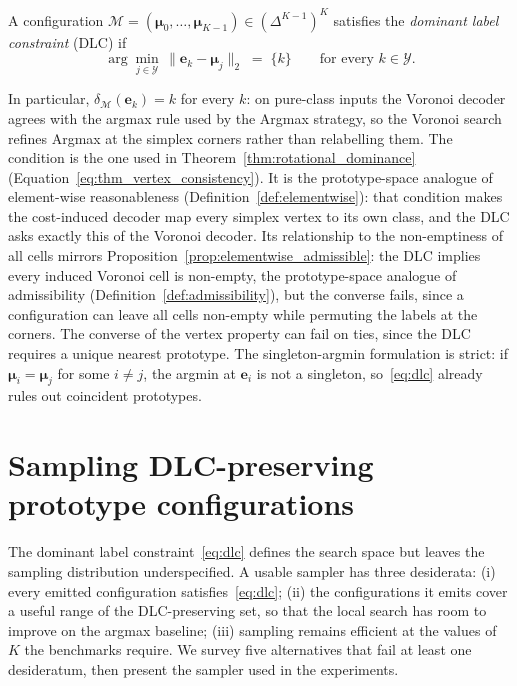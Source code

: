 \begin{definition}\label{def:dlc}
A configuration $\mathcal{M} = (\boldsymbol{\mu}_0, \ldots, \boldsymbol{\mu}_{K-1}) \in (\Delta^{K-1})^K$ satisfies the \emph{dominant label constraint} (DLC) if
\begin{equation}
    \arg\min_{j \in \mathcal{Y}} \, \|\mathbf{e}_k - \boldsymbol{\mu}_j\|_2 \;=\; \{k\} \qquad \text{for every } k \in \mathcal{Y}.
    \label{eq:dlc}
\end{equation}
\end{definition}

In particular, $\delta_{\mathcal{M}}(\mathbf{e}_k) = k$ for every $k$: on pure-class inputs the Voronoi decoder agrees with the argmax rule used by the Argmax strategy, so the Voronoi search refines Argmax at the simplex corners rather than relabelling them. The condition is the one used in Theorem~\ref{thm:rotational_dominance} (Equation~\eqref{eq:thm_vertex_consistency}). It is the prototype-space analogue of element-wise reasonableness (Definition~\ref{def:elementwise}): that condition makes the cost-induced decoder map every simplex vertex to its own class, and the DLC asks exactly this of the Voronoi decoder. Its relationship to the non-emptiness of all cells mirrors Proposition~\ref{prop:elementwise_admissible}: the DLC implies every induced Voronoi cell is non-empty, the prototype-space analogue of admissibility (Definition~\ref{def:admissibility}), but the converse fails, since a configuration can leave all cells non-empty while permuting the labels at the corners. The converse of the vertex property can fail on ties, since the DLC requires a unique nearest prototype. The singleton-argmin formulation is strict: if $\boldsymbol{\mu}_i = \boldsymbol{\mu}_j$ for some $i \neq j$, the argmin at $\mathbf{e}_i$ is not a singleton, so~\eqref{eq:dlc} already rules out coincident prototypes.

\section{Sampling DLC-preserving prototype configurations}\label{sec:voronoi_samplers}\label{sec:voronoi_comparison}

The dominant label constraint~\eqref{eq:dlc} defines the search space but leaves the sampling distribution underspecified. A usable sampler has three desiderata: (i) every emitted configuration satisfies~\eqref{eq:dlc}; (ii) the configurations it emits cover a useful range of the DLC-preserving set, so that the local search has room to improve on the argmax baseline; (iii) sampling remains efficient at the values of $K$ the benchmarks require. We survey five alternatives that fail at least one desideratum, then present the sampler used in the experiments.

